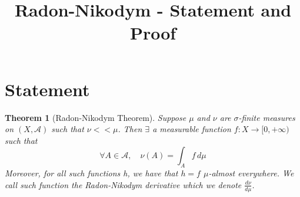 \documentclass[11pt]{article}
\title{Radon-Nikodym - Statement and Proof}
\author{}
\date{}
\newcommand{\dm}{\ensuremath{\,d\mu}}
\newcommand{\mdf}[1]{{\color{red} #1}}
\newtheorem{theorem}{Theorem}[section]
\begin{document}
\maketitle
\section{Statement}
\begin{theorem}[Radon-Nikodym Theorem]
Suppose $\mu$ and $\nu$ are $\sigma$-finite measures on $(X, \mathcal{A})$ such that $\nu << \mu$.
Then $\exists$ a measurable function $f: X \to [0, +\infty)$ such that
\[
	\forall A \in \mathcal{A}, \quad \nu(A)=\int_A f \dm
\]
Moreover, for all such functions h, we have that $h=f$ $\mu$-almost everywhere.
We call such function the \mdf{Radon-Nikodym derivative} which we denote $\frac{d\nu}{d\mu}$.
\end{theorem}
\end{document}
